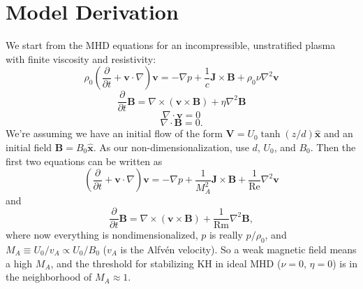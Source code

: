 \documentclass[aps,pop,preprint]{revtex4}
\newcommand{\Rm}{\mathrm{Rm}}
\renewcommand{\Re}{\mathrm{Re}}
\begin{document}
	
	\section{Model Derivation}
	\label{sec:derivation}
	We start from the MHD equations for an incompressible, unstratified plasma with finite viscosity and resistivity:
	\begin{equation}
	\rho_0 \left( \frac{\partial}{\partial t} + \mathbf{v} \cdot \nabla \right) \mathbf{v} = -\nabla p + \frac{1}{c} \mathbf{J} \times \mathbf{B} + \rho_0 \nu \nabla^2 \mathbf{v}
	\end{equation}
	\begin{equation}
	\frac{\partial}{\partial t} \mathbf{B} = \nabla \times (\mathbf{v} \times \mathbf{B}) + \eta \nabla^2 \mathbf{B}
	\end{equation}
	\begin{equation}
	\nabla \cdot \mathbf{v} = 0
	\end{equation}
	\begin{equation}
	\nabla \cdot \mathbf{B} = 0.
	\end{equation}
	We're assuming we have an initial flow of the form $\mathbf{V} = U_0 \tanh (z/d) \hat{\mathbf{x}}$ and an initial field $\mathbf{B} = B_0 \hat{\mathbf{x}}$. 
	As our non-dimensionalization, use $d$, $U_0$, and $B_0$. 
	Then the first two equations can be written as  %
	\begin{equation}
	\left( \frac{\partial}{\partial t} + \mathbf{v} \cdot \nabla \right) \mathbf{v} = -\nabla p + \frac{1}{M_A^2} \mathbf{J} \times \mathbf{B} + \frac{1}{\Re} \nabla^2 \mathbf{v}
	\end{equation}
	and
	\begin{equation}
	\frac{\partial}{\partial t} \mathbf{B} = \nabla \times (\mathbf{v} \times \mathbf{B}) + \frac{1}{\Rm} \nabla^2 \mathbf{B},
	\end{equation}
	where now everything is nondimensionalized, $p$ is really $p/\rho_0$, and $M_A \equiv U_0/v_A \propto U_0/B_0$ ($v_A$ is the Alfv\'{e}n velocity). 
	So a weak magnetic field means a high $M_A$, and the threshold for stabilizing KH in ideal MHD ($\nu = 0$, $\eta = 0$) is in the neighborhood of $M_A \approx 1$.
	
\end{document}
